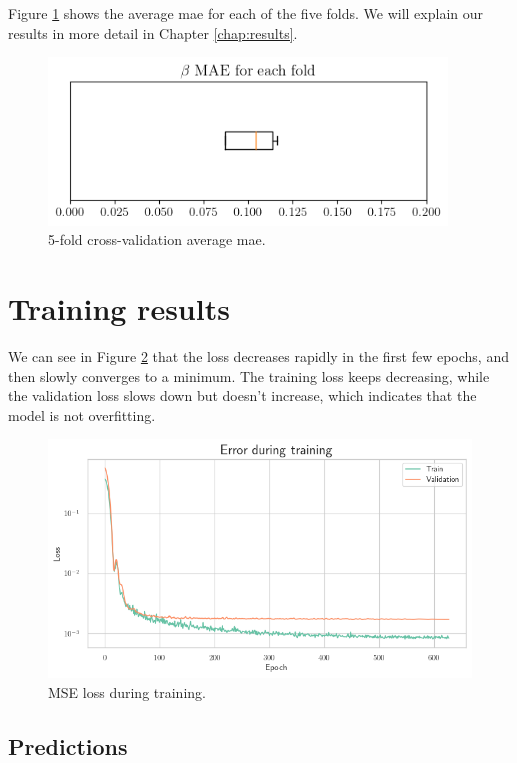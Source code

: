 Figure \ref{fig:cross-validation} shows the average \gls{mae} for each of the
five folds. We will explain our results in more detail in Chapter
\ref{chap:results}.

\begin{figure}[H]
	\centering
	\includegraphics[width=300pt]{files/average_mae.png}
	\caption{5-fold cross-validation average \gls{mae}.}
	\label{fig:cross-validation}
\end{figure}

\section{Training results}

We can see in Figure \ref{fig:loss} that the loss decreases rapidly in the
first few epochs, and then slowly converges to a minimum. The training loss
keeps decreasing, while the validation loss slows down but doesn't increase,
which indicates that the model is not overfitting.

\begin{figure}[H]
	\centering
	\includegraphics[width=\textwidth]{files/loss}
	\caption{MSE loss during training.}
	\label{fig:loss}
\end{figure}

\subsection{Predictions}

